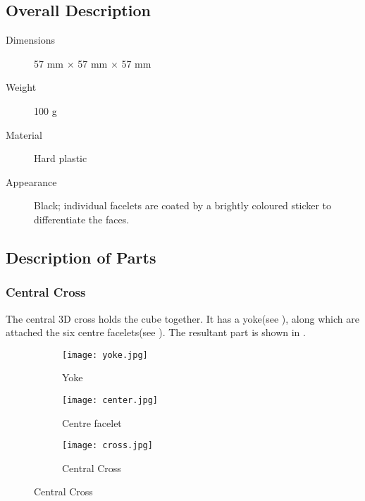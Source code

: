 \subsection{Overall Description}
\begin{description}
	\item[Dimensions] 57 mm ${\times}$ 57 mm ${\times}$ 57 mm
	\item[Weight]	100 g
	\item[Material] Hard plastic
	\item[Appearance] Black; individual facelets are coated by a brightly coloured sticker to differentiate the faces.
\end{description}
\subsection{Description of Parts}
	\subsubsection{Central Cross}
		The central 3D cross holds the cube together. It has a yoke(see ), along which are attached the six centre facelets(see ). The resultant part is shown in .
		\begin{figure}[h]
			\centering
			\begin{subfigure}[b]{0.3\textwidth}
				\texttt{[image: yoke.jpg]}
				\caption{Yoke}\label{fig:yoke}
			\end{subfigure}\begin{subfigure}[b]{0.3\textwidth}
				\texttt{[image: center.jpg]}
				\caption{Centre facelet}\label{fig:centre}
			\end{subfigure}\begin{subfigure}[b]{0.3\textwidth}
				\texttt{[image: cross.jpg]}
				\caption{Central Cross}\label{fig:cross}
			\end{subfigure}
		\end{figure}
	\subsubsection{}	